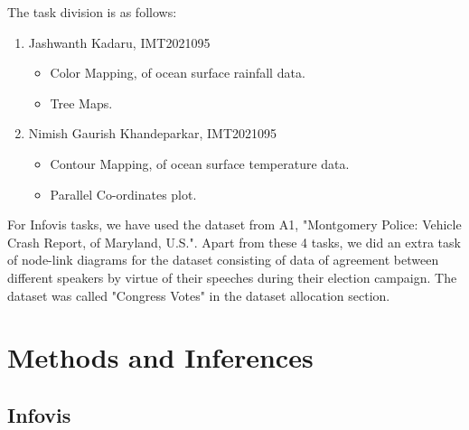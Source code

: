 \documentclass[conference]{IEEEtran}
\begin{document}
The task division is as follows: 
\begin{enumerate}
\item Jashwanth Kadaru, IMT2021095
\begin{itemize}
    \item Color Mapping, of ocean surface rainfall data.
    \item Tree Maps.
\end{itemize}

\item Nimish Gaurish Khandeparkar, IMT2021095
\begin{itemize}
    \item Contour Mapping, of ocean surface temperature data.
    \item Parallel Co-ordinates plot.
\end{itemize}

\end{enumerate}

For Infovis tasks, we have used the dataset from A1, "Montgomery Police: Vehicle Crash Report, of Maryland, U.S.". Apart from these 4 tasks, we did an extra task of node-link diagrams for the dataset consisting of data of agreement between different speakers by virtue of their speeches during their election campaign. The dataset was called "Congress Votes" in the dataset allocation section.  

\section{Methods and Inferences}

\subsection{Infovis}
\end{document}
